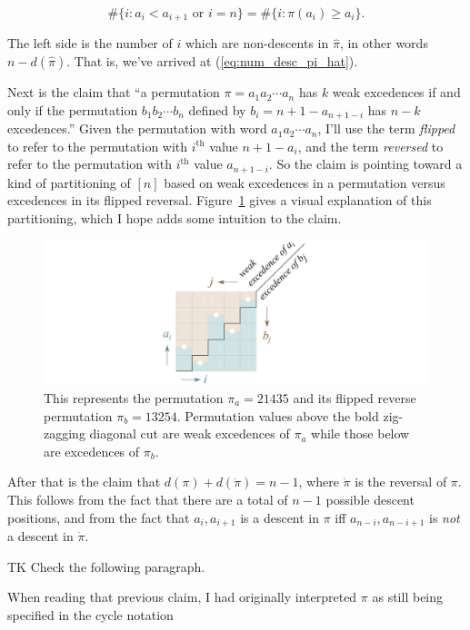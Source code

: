 \documentclass[]{article}
\begin{document}
\[\#\{i:a_i<a_{i+1}\text{ or }i=n\} = \#\{i:\pi(a_i)\ge a_i\}.\]

The left side is the number of \(i\) which are non-descents in
\(\hat\pi\), in other words \(n - d(\hat\pi)\). That is, we've arrived
at (\ref{eq:num_desc_pi_hat}).

Next is the claim that ``a permutation \(\pi=a_1a_2\cdots a_n\) has
\(k\) weak excedences if and only if the permutation
\(b_1b_2\cdots b_n\) defined by \(b_i = n+1-a_{n+1-i}\) has \(n-k\)
excedences.'' Given the permutation with word \(a_1a_2\cdots a_n\), I'll
use the term \emph{flipped} to refer to the permutation with
\(i^\text{th}\) value \(n+1-a_i\), and the term \emph{reversed} to refer
to the permutation with \(i^\text{th}\) value \(a_{n+1-i}\). So the
claim is pointing toward a kind of partitioning of \([n]\) based on weak
excedences in a permutation versus excedences in its flipped reversal.
Figure~\ref{fig:excedence} gives a visual explanation of this
partitioning, which I hope adds some intuition to the claim.

\begin{figure}[htbp]
\centering
\includegraphics{images/pdfs/excedence.pdf}
\caption{\label{fig:excedence}This represents the permutation
\(\pi_a = 21435\) and its flipped reverse permutation \(\pi_b = 13254\).
Permutation values above the bold zig-zagging diagonal cut are weak
excedences of \(\pi_a\) while those below are excedences of
\(\pi_b\).}\label{fig:excedence}
\end{figure}

After that is the claim that \(d(\pi) + d(\dot\pi) = n - 1\), where
\(\dot\pi\) is the reversal of \(\pi\). This follows from the fact that
there are a total of \(n - 1\) possible descent positions, and from the
fact that \(a_i, a_{i+1}\) is a descent in \(\pi\) iff
\(a_{n-i}, a_{n-i+1}\) is \emph{not} a descent in \(\dot\pi\).

TK Check the following paragraph.

When reading that previous claim, I had originally interpreted \(\pi\)
as still being specified in the cycle notation
\end{document}
